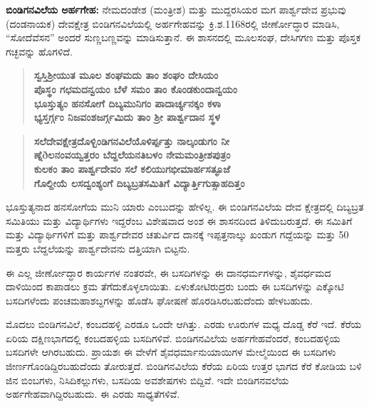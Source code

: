 \textbf{ಬಿಂಡಿಗನವಿಲೆಯ ಅರ್ಹಗೇಹ:} ನೇಮದಂಡೇಶ (ಮಂತ್ರೀಶ) ಮತ್ತು ಮುದ್ದರಸಿಯರ ಮಗ ಪಾರ್ಶ್ವದೇವ ಪ್ರಭುವು (ದಂಡನಾಯಕ) ದೇವಕ್ಷೇತ್ರ ಬಿಂಡಿಗನವಿಲೆಯಲ್ಲಿ ಅರ್ಹಗೇಹವನ್ನು ಕ್ರಿ.ಶ.1168ರಲ್ಲಿ ಜೀರ್ಣೋದ್ಧಾರ ಮಾಡಿಸಿ, “ಸೋದೆವೆಸನ” ಅಂದರೆ ಸುಣ್ಣಬಣ್ಣವನ್ನು ಮಾಡಿಸುತ್ತಾನೆ. ಈ ಶಾಸನದಲ್ಲಿ ಮೂಲಸಂಘ, ದೇಸಿಗಗಣ ಮತ್ತು ಪೊಸ್ತಕ ಗಚ್ಛವನ್ನು ಹೊಗಳಿದೆ.

\smallskip

\begin{verse}
\textbf{ಸ್ವಸ್ತಿಶ‍್ರೀಯುತ ಮೂಲ ಶಂಘಮದು ತಾಂ ಶಂಘಂ ದೇಸಿಯಂ} \\\textbf{ಪೊಸ್ಥಂ ಗಛಮದನ್ವಯಂ ಬೆಳೆ ಸಮಂ ತಾಂ ಕೊಂಡಕುಂದಾನ್ವಯಂ} \\\textbf{ಭೂಸ್ತುತ್ಯಂ ಹನಸೋಗೆ ದಿಬ್ಯಮುನಿಗಂ ಪಾದಾರ್ಚ್ಯನಕ್ಕಂ ಕಳಾ} \\\textbf{ಭ್ಯಸ್ತರ್ಗ್ಗಂ ನಿಜವಂಶಜರ್ಗ್ಗಮಿದು ತಾಂ ಶ‍್ರೀ ಪಾರ್ಶ್ವದಾನ ಸ್ಥಳ}
\end{verse}

\smallskip

\begin{verse}
\textbf{ಸಲೆದೇವಕ್ಷೇತ್ರದೊಳ್ಬಿಂಡಿಗನವಿಲೆಯೊಳಿರ್ಪ್ಪತ್ತು ನಾಲ್ಕಂಡುಗಂ ನೀ} \\\textbf{ಣ್ನೆðಲನಂವಯ್ವತ್ತರಂ ಬೆದ್ದಲೆಯನತಿಬಳಂ ನೇಮಮಂತ್ರೀಶಪುತ್ರಂ} \\\textbf{ಕುಲಕಂ ತಾಂ ಪಾರ್ಶ್ವದೇವಂ ಸಲೆ ಕಲಿಯುಗಭೀಮಾರ್ಹಸತ್ಫೂಜೆ} \\\textbf{ಗೊಲ್ದೀಯೆ ಲಸದ್ವಂಶ್ಯಂಗೆ ದಿಬ್ಯಬ್ರತಸಮಿತಿಗೆ ವಿದ್ಯಾರ್ತ್ತಿಗುತ್ಸಾಹದಿತ್ತಂ}
\end{verse}

ಭೂಸ್ತುತ್ಯನಾದ ಹನಸೋಗೆಯ ಮುನಿ ಯಾರು ಎಂಬುದನ್ನು ಹೇಳಿಲ್ಲ. ಈ ಬಿಂಡಿಗನವಿಲೆಯ ದೇವ ಕ್ಷೇತ್ರದಲ್ಲಿ ದಿಬ್ಯಬ್ರತ ಸಮಿತಿಯು ಮತ್ತು ವಿದ್ಯಾರ್ಥಿಗಳು ಇದ್ದರೆಂಬ ವಿಶೇಷವಾದ ಅಂಶ ಈ ಶಾಸನದಿಂದ ತಿಳಿದುಬರುತ್ತದೆ. ಈ ಸಮಿತಿಗೆ ಮತ್ತು ವಿದ್ಯಾರ್ಥಿಗಳಿಗೆ ಮತ್ತು ಪಾರ್ಶ್ವದೇವರ ಚತುರ್ವಿದ ದಾನಕ್ಕೆ ಇಪ್ಪತ್ತನಾಲ್ಕು ಖಂಡುಗ ಗದ್ದೆಯನ್ನು ಮತ್ತು 50 ಮತ್ತರು ಬೆದ್ದಲೆಯನ್ನು ಪಾರ್ಶ್ವದೇವನು ದತ್ತಿಯಾಗಿ ಬಿಟ್ಟನು.

ಈ ಎಲ್ಲ ಜೀರ್ಣೋದ್ಧಾರ ಕಾರ್ಯಗಳ ನಂತರವೇ, ಈ ಬಸದಿಗಳನ್ನು ಈ ದಾನಧರ್ಮಗಳನ್ನು, ಶೈವರ್ಧಮದ ದಾಳಿಯಿಂದ ಕಾಪಾಡಲು ಕ್ರಮ ತೆಗೆದುಕೊಳ್ಳಲಾಯಿತು. ಏಳುಕೋಟಿರುದ್ರರು ಬಂದು ಈ ಬಸದಿಗಳನ್ನು ಎಕ್ಕೋಟಿ ಬಸದಿಗಳೆಂದು ಪಂಚಮಹಾಶಬ್ದಗಳನ್ನು ಹೊಡೆಸಿ ಘೋಷಣೆ ಹೊರಡಿಸಿರಬಹುದೆಂದು ಹೇಳಬಹುದು.

ಮೊದಲು ಬಿಂಡಿಗನವಿಲೆ, ಕಂಬದಹಳ್ಳಿ ಎರಡೂ ಒಂದೇ ಆಗಿತ್ತು. ಎರಡು ಊರುಗಳ ಮಧ್ಯ ದೊಡ್ಡ ಕೆರೆ ಇದೆ. ಕೆರೆಯ ಏರಿಯ ದಕ್ಷಿಣಭಾಗದಲ್ಲಿ ಕಂಬದಹಳ್ಳಿಯ ಬಸದಿಗಳಿವೆ. ಬಿಂಡಿಗನವಿಲೆಯ ಅರ್ಹಗೇಹವೆಂದರೆ, ಕಂಬದಹಳ್ಳಿಯ ಬಸದಿಗಳೇ ಆಗಿರಬಹುದು. ಪ್ರಾಯಶಃ ಈ ವೇಳೆಗೆ ಶೈವಧರ್ಮಾನುಯಾಯಿಗಳ ಮೇಲ್ಮೆಯಿಂದ ಈ ಬಸದಿಗಳು ಜೀರ್ಣಗೊಂಡಿದ್ದಿರಬಹುದೆಂದು ತೋರುತ್ತದೆ. ಬಿಂಡಿಗನವಿಲೆಯ ಕೆರೆಯ ಏರಿಯ ಉತ್ತರ ಭಾಗದ ಕೆರೆ ಕೋಡಿಯ ಬಳಿ ಜಿನ ಬಿಂಬಗಳು, ನಿಸಿದಿಕಲ್ಲುಗಳು, ಬಸದಿಯ ಅವಶೇಷಗಳು ಬಿದ್ದಿವೆ. ಇದೇ ಬಿಂಡಿಗನವಲೆಯ ಅರ್ಹಗೇಹವಾಗಿದ್ದಿರ\-ಬಹುದು. ಈ ಎರಡು ಸಾಧ್ಯತೆಗಳಿವೆ.

